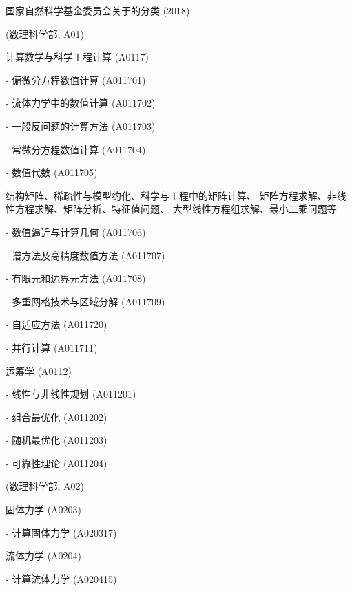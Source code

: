 \begin{Block}
	国家自然科学基金委员会关于的分类 (2018):
	\begin{blist}
		\item[]  (数理科学部, A01)
		\begin{blist}
			\item 计算数学与科学工程计算 (A0117)
			\begin{blist}
				\item[-] 偏微分方程数值计算 (A011701)
				\item[-] 流体力学中的数值计算 (A011702)
				\item[-] 一般反问题的计算方法 (A011703)
				\item[-] 常微分方程数值计算 (A011704)
				\item[-] 数值代数 (A011705)
				\begin{blist}
					\item[] 结构矩阵、稀疏性与模型约化、科学与工程中的矩阵计算、
					矩阵方程求解、非线性方程求解、矩阵分析、特征值问题、
					大型线性方程组求解、最小二乘问题等
				\end{blist}
				\item[-] 数值逼近与计算几何 (A011706)
				\item[-] 谱方法及高精度数值方法 (A011707)
				\item[-] 有限元和边界元方法 (A011708)
				\item[-] 多重网格技术与区域分解 (A011709)
				\item[-] 自适应方法 (A011720)
				\item[-] 并行计算 (A011711)
			\end{blist}
			\item 运筹学 (A0112)
			\begin{blist}
				\item[-] 线性与非线性规划 (A011201)
				\item[-] 组合最优化 (A011202)
				\item[-] 随机最优化 (A011203)
				\item[-] 可靠性理论 (A011204)
			\end{blist}
		\end{blist}
		
		\item[]  (数理科学部, A02)
		\begin{blist}
			\item 固体力学 (A0203)
			\begin{blist}
				\item[-] 计算固体力学 (A020317)
			\end{blist}
			\item 流体力学 (A0204)
			\begin{blist}
				\item[-] 计算流体力学 (A020415)
			\end{blist}
		\end{blist}
		

\end{blist}
\end{Block}
